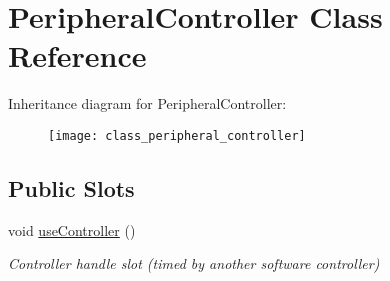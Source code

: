 \hypertarget{class_peripheral_controller}{\section{Peripheral\-Controller Class Reference}
\label{class_peripheral_controller}
}
Inheritance diagram for Peripheral\-Controller\-:\begin{figure}[H]
\begin{center}
\leavevmode
\texttt{[image: class\_peripheral\_controller]}
\end{center}
\end{figure}
\subsection*{Public Slots}
\begin{DoxyCompactItemize}
\item 
void \hyperlink{class_peripheral_controller_a87a5573968219bcf9633943fe0204d52}{use\-Controller} ()
\begin{DoxyCompactList}\small\item\em Controller handle slot (timed by another software controller) \end{DoxyCompactList}\end{DoxyCompactItemize}
